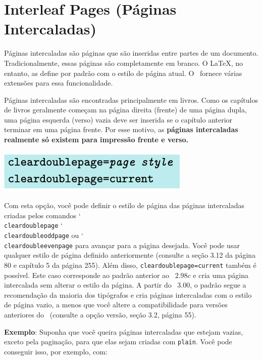 \chapter[Interleaf Pages]{Interleaf Pages (Páginas Intercaladas)}

Páginas intercaladas são páginas que são inseridas entre partes de um documento. Tradicionalmente, essas páginas são completamente em branco. O \LaTeX, no entanto, as define por padrão com o estilo de página atual. O \KOMAScript\ fornece várias extensões para essa funcionalidade.

Páginas intercaladas são encontradas principalmente em livros. Como os capítulos de livros geralmente começam na página direita (frente) de uma página dupla, uma página esquerda (verso) vazia deve ser inserida se o capítulo anterior terminar em uma página frente. Por esse motivo, as \textbf{páginas intercaladas realmente só existem para impressão frente e verso.}
\begin{center}
    \includegraphics[width=0.5\linewidth]{imagens/imagem15.png}
\end{center}
Com esta opção, você pode definir o estilo de página das páginas intercaladas criadas pelos comandos \char`\\\texttt{clear\-dou\-ble\-pa\-ge} \char`\\\texttt{clear\-dou\-ble\-odd\-pa\-ge}  ou \char`\\\texttt{clear\-dou\-ble\-e\-ven\-pa\-ge} para avançar para a página desejada. Você pode usar qualquer estilo de página definido anteriormente (consulte a seção 3.12 da página 80 e capítulo 5 da página 255). Além disso, \texttt{clear\-dou\-ble\-pa\-ge=cur\-rent} também é possível. Este caso corresponde ao padrão anterior ao \KOMAScript~$2.98c$ e cria uma página intercalada sem alterar o estilo da página. A partir do \KOMAScript~$3.00$, o padrão segue a recomendação da maioria dos tipógrafos e cria páginas intercaladas com o estilo de página vazio, a menos que você altere a compatibilidade para versões anteriores do \KOMAScript\ (consulte a opção versão, seção 3.2, página 55).

\textbf{Exemplo}: Suponha que você queira páginas intercaladas que estejam vazias, exceto pela paginação, para que elas sejam criadas com \texttt{plain}. Você pode conseguir isso, por exemplo, com:

